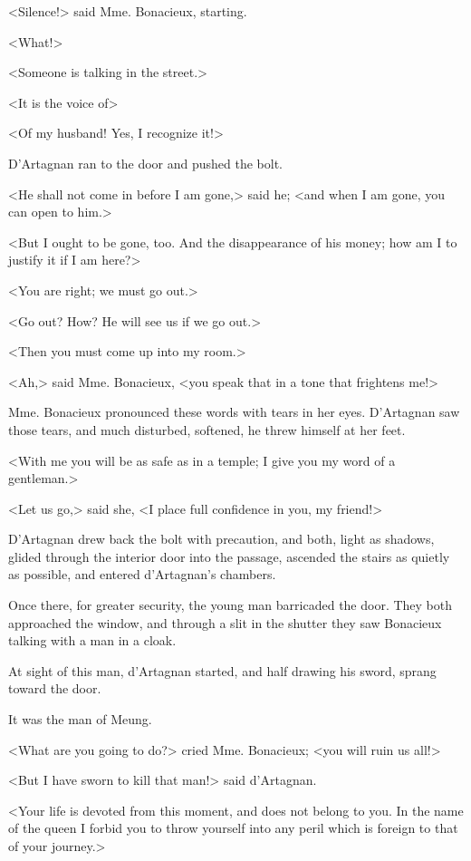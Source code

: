 <Silence!> said Mme. Bonacieux, starting. 

<What!> 

<Someone is talking in the street.> 

<It is the voice of\longdash> 

<Of my husband! Yes, I recognize it!> 

D'Artagnan ran to the door and pushed the bolt. 

<He shall not come in before I am gone,> said he; <and when I am gone, you can open to him.> 

<But I ought to be gone, too. And the disappearance of his money; how am I to justify it if I am here?> 

<You are right; we must go out.> 

<Go out? How? He will see us if we go out.> 

<Then you must come up into my room.> 

<Ah,> said Mme. Bonacieux, <you speak that in a tone that frightens me!> 

Mme. Bonacieux pronounced these words with tears in her eyes. D'Artagnan saw those tears, and much disturbed, softened, he threw himself at her feet. 

<With me you will be as safe as in a temple; I give you my word of a gentleman.> 

<Let us go,> said she, <I place full confidence in you, my friend!> 

D'Artagnan drew back the bolt with precaution, and both, light as shadows, glided through the interior door into the passage, ascended the stairs as quietly as possible, and entered d'Artagnan's chambers. 

Once there, for greater security, the young man barricaded the door. They both approached the window, and through a slit in the shutter they saw Bonacieux talking with a man in a cloak. 

At sight of this man, d'Artagnan started, and half drawing his sword, sprang toward the door. 

It was the man of Meung. 

<What are you going to do?> cried Mme. Bonacieux; <you will ruin us all!> 

<But I have sworn to kill that man!> said d'Artagnan. 

<Your life is devoted from this moment, and does not belong to you. In the name of the queen I forbid you to throw yourself into any peril which is foreign to that of your journey.> 

